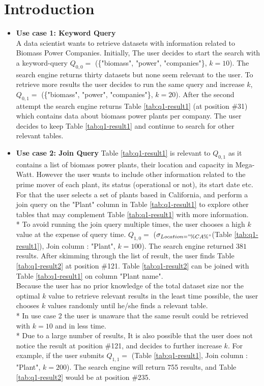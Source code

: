 \section{Introduction}
\label{sec:introduction}

\begin{itemize}
	\item \textbf{Use case 1: Keyword Query}\\
	 A data scientist wants to retrieve datasets with information related to Biomass Power Companies. Initially,  The user decides to start the search with a keyword-query $Q_{0,0} = $  (\{"biomass", "power", "companies"\}, $k = 10$). The search engine returns thirty datasets but none seem relevant to the user.
	 To retrieve more results the user decides to run the same query and increase $k$, $Q_{0,1} = $  (\{"biomass", "power", "companies"\}, $k = 20$). After the second attempt the search engine returns Table \ref{tab:q1-result1} (at position \#31) which contains data about biomass power plants per company. The user decides to keep Table \ref{tab:q1-result1} and continue to search for other relevant tables.\\
	
	\item \textbf{Use case 2: Join Query}
	Table \ref{tab:q1-result1} is relevant to $Q_{0,1}$ as it contains a list of biomass power plants, their location and capacity in Mega-Watt. However the user wants to include other information related to the prime mover of each plant, its status (operational or not), its start date etc. For that the user selects a set of plants based in California,  and  perform a join query on the "Plant" column in Table \ref{tab:q1-result1} to explore other tables that may complement  Table \ref{tab:q1-result1} with more information. \\*
	To avoid running the join query multiple times, the user chooses a high $k$ value at the expense of query time.
	$Q_{1,0} =$ ($\sigma_{Location = "\%CA\%"}$(Table \ref{tab:q1-result1}), Join column : "Plant", $k = 100$). The search engine returned $381$ results. After skimming through the list of result, the user finds Table \ref{tab:q1-result2} at position \#121. Table \ref{tab:q1-result2} can be joined with Table \ref{tab:q1-result1} on column "Plant name". \\
	
	
	Because the user has no prior knowledge of the total dataset size nor the optimal $k$ value to retrieve relevant results in the least time possible, the user chooses $k$ values randomly until he/she finds a relevant table.\\*
	In use case 2 the user is unaware that the same result could be retrieved with $k = 10$ and in less time.  \\* Due to a large number of results, It is also possible that the user does not notice the result at position  \#121, and decides to further increase $k$. For example, if the user submits $Q_{1,1} =$ (Table \ref{tab:q1-result1}, Join column : "Plant", $k = 200$). The search engine will return 755 results, and Table \ref{tab:q1-result2} would be at position \#235.
	

\end{itemize}
